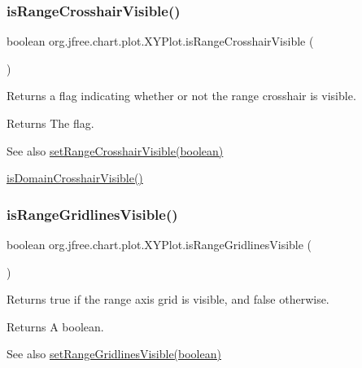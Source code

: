 \subsubsection{\texorpdfstring{is\+Range\+Crosshair\+Visible()}{isRangeCrosshairVisible()}}
{\footnotesize\ttfamily boolean org.\+jfree.\+chart.\+plot.\+X\+Y\+Plot.\+is\+Range\+Crosshair\+Visible (\begin{DoxyParamCaption}{ }\end{DoxyParamCaption})}

Returns a flag indicating whether or not the range crosshair is visible.

\begin{DoxyReturn}{Returns}
The flag.
\end{DoxyReturn}
\begin{DoxySeeAlso}{See also}
\mbox{\hyperlink{classorg_1_1jfree_1_1chart_1_1plot_1_1_x_y_plot_a0ac34a6f57e3bbcfaba9a502be7fbe2e}{set\+Range\+Crosshair\+Visible(boolean)}} 

\mbox{\hyperlink{classorg_1_1jfree_1_1chart_1_1plot_1_1_x_y_plot_ae1fc992f5b9f115943993c300b669c8d}{is\+Domain\+Crosshair\+Visible()}} 
\end{DoxySeeAlso}
\mbox{\label{classorg_1_1jfree_1_1chart_1_1plot_1_1_x_y_plot_a16bed12a303c489f3ff2a19e03ae63a7}} 
\subsubsection{\texorpdfstring{is\+Range\+Gridlines\+Visible()}{isRangeGridlinesVisible()}}
{\footnotesize\ttfamily boolean org.\+jfree.\+chart.\+plot.\+X\+Y\+Plot.\+is\+Range\+Gridlines\+Visible (\begin{DoxyParamCaption}{ }\end{DoxyParamCaption})}

Returns {\ttfamily true} if the range axis grid is visible, and {\ttfamily false} otherwise.

\begin{DoxyReturn}{Returns}
A boolean.
\end{DoxyReturn}
\begin{DoxySeeAlso}{See also}
\mbox{\hyperlink{classorg_1_1jfree_1_1chart_1_1plot_1_1_x_y_plot_a0d2df1446c52a5f9446947bf4e5ae7da}{set\+Range\+Gridlines\+Visible(boolean)}} 
\end{DoxySeeAlso}
\mbox{\label{classorg_1_1jfree_1_1chart_1_1plot_1_1_x_y_plot_a114ea48062043f226940284401b8b4ec}} 
